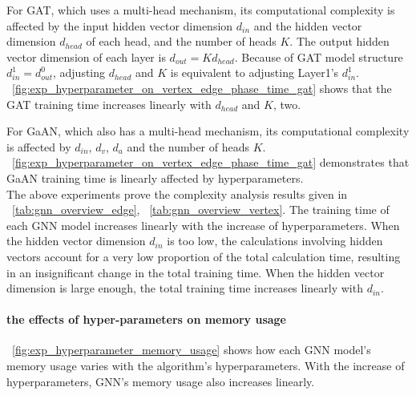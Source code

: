 For GAT,  which uses a multi-head mechanism, its computational complexity is affected by the input hidden vector dimension $d_{in}$ and the hidden vector dimension $d_{head}$ of each head, and the number of heads $K$.
The output hidden vector dimension of each layer is $d_{out}=K d_{head}$.
Because of GAT model structure $d^1_{in}=d^0_{out}$, adjusting $d_{head}$ and $K$ is equivalent to adjusting Layer1’s $d^1_{in}$.
\figurename~\ref{fig:exp_hyperparameter_on_vertex_edge_phase_time_gat} shows that the GAT training time increases linearly with $d_{head}$ and $K$, two.

For GaAN, which also has a multi-head mechanism, its computational complexity is affected by $d_{in}$, $d_v$, $d_a$ and the number of heads $K$.
\figurename~\ref{fig:exp_hyperparameter_on_vertex_edge_phase_time_gat} demonstrates that GaAN training time is linearly affected by hyperparameters.
\\
The above experiments prove the complexity analysis results given in \tablename~\ref{tab:gnn_overview_edge}, \tablename~\ref{tab:gnn_overview_vertex}. 
The training time of each GNN model increases linearly with the increase of hyperparameters.
When the hidden vector dimension $d_{in}$ is too low, the calculations involving hidden vectors account for a very low proportion of the total calculation time,
resulting in an insignificant change in the total training time.
When the hidden vector dimension is large enough, the total training time increases linearly with $d_{in}$.

\paragraph{the effects of hyper-parameters on memory usage}

\figurename~\ref{fig:exp_hyperparameter_memory_usage} shows how each GNN model's memory usage varies with the algorithm's hyperparameters.
With the increase of hyperparameters, GNN's memory usage also increases linearly.

